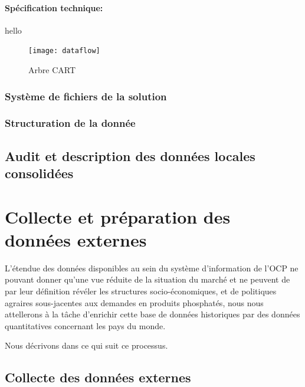 	\paragraph{Spécification technique:\\}
	hello
		\begin{figure}[h]
		    		\centering
		    		\texttt{[image: dataflow]}
		    		\caption{Arbre CART}
		    		\label{fig:DF}
		\end{figure}
	\subsubsection{Système de fichiers de la solution}
	\subsubsection{Structuration de la donnée}
	\subsection{Audit et description des données locales consolidées}
	\section{Collecte et préparation des données externes}
	L'étendue des données disponibles au sein du système d'information de l'OCP ne pouvant donner qu'une vue réduite de la situation du marché et ne peuvent de par leur définition révéler les structures socio-économiques,  et de politiques agraires sous-jacentes aux demandes en produits phosphatés, nous nous attellerons à la tâche d'enrichir cette base de données historiques par des données quantitatives concernant les pays du monde.
	\par
	Nous décrivons dans ce qui suit ce processus. 
	\subsection{Collecte des données externes}
